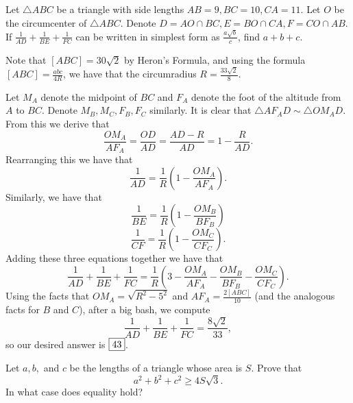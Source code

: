 \documentclass[letterpaper,oneside]{scrartcl}
\begin{document}
\begin{problem*}
  Let $\triangle ABC$ be a triangle with side lengths $AB = 9, BC = 10, CA = 11$. Let $O$ be the circumcenter of $\triangle ABC$. Denote $D = AO \cap BC, E = BO \cap CA, F = CO \cap AB$. If $\tfrac{1}{AD} + \tfrac{1}{BE} + \tfrac{1}{FC}$ can be written in simplest form as $\tfrac{a \sqrt{b}}{c}$, find $a + b + c$.
\end{problem*}
\begin{soln}
  Note that \([ABC] = 30\sqrt2\) by Heron's Formula, and using the formula \([ABC] = \frac{abc}{4R}\), we have that the circumradius \(R = \frac{33\sqrt2}{8}\).

  Let \(M_A\) denote the midpoint of \(BC\) and \(F_A\) denote the foot of the altitude from \(A\) to \(BC\). Denote \(M_B, M_C, F_B, F_C\) similarly. It is clear that \(\triangle AF_AD \sim \triangle OM_AD.\) From this we derive that 
  \[\frac{OM_A}{AF_A} = \frac{OD}{AD} = \frac{AD-R}{AD} = 1 - \frac{R}{AD}.\] Rearranging this we have that 
  \[\frac{1}{AD} = \frac{1}{R}\left(1 - \frac{OM_A}{AF_A}\right).\]
  Similarly, we have that 
  \[\frac{1}{BE} = \frac{1}{R}\left(1 - \frac{OM_B}{BF_B}\right)\]
  \[\frac{1}{CF} = \frac{1}{R}\left(1 - \frac{OM_C}{CF_C}\right).\]
  Adding these three equations together we have that 
  \[\frac{1}{AD} + \frac{1}{BE} + \frac{1}{FC} = \frac{1}{R}\left(3 - \frac{OM_A}{AF_A} - \frac{OM_B}{BF_B} - \frac{OM_C}{CF_C}\right).\]
  Using the facts that \(OM_A = \sqrt{R^2 - 5^2}\) and \(AF_A = \frac{2[ABC]}{10}\) (and the analogous facts for \(B\) and \(C\)), after a big bash, we compute
  \[\frac{1}{AD} + \frac{1}{BE} + \frac{1}{FC}  = \frac{8\sqrt2}{33},\]
  so our desired answer is \(\fbox{43}\).
\end{soln}
\newpage
\begin{problem*}
  [IMO 1961/2]
  Let \(a,b,\) and \(c\) be the lengths of a triangle whose area is \(S\). Prove that \[a^2 + b^2 + c^2 \ge 4S\sqrt{3}.\] In what case does equality hold?
\end{problem*}
\end{document}
